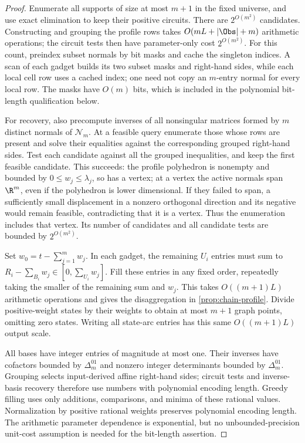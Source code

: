 \begin{proof}
Enumerate all supports of size at most $m+1$ in the fixed universe,
and use exact elimination to keep their positive circuits. There
are $2^{O(m^2)}$ candidates. Constructing and grouping the profile
rows takes $O(mL+|\Obs|+m)$ arithmetic operations; the circuit
tests then have parameter-only cost $2^{O(m^2)}$.
For this count, preindex subset normals by bit masks and cache the
singleton indices. A scan of each gadget builds its two subset masks
and right-hand sides, while each local cell row uses a cached index;
one need not copy an $m$-entry normal for every local row. The masks
have $O(m)$ bits, which is included in the polynomial bit-length
qualification below.

For recovery, also precompute inverses of all nonsingular matrices
formed by $m$ distinct normals of $\mathcal N_m$. At a feasible
query enumerate those whose rows are present and solve their
equalities against the corresponding grouped right-hand sides.
Test each candidate against all the grouped inequalities, and keep
the first feasible candidate. This succeeds: the profile polyhedron
is nonempty and bounded by $0\le w_j\le\lambda_j$, so has a
vertex; at a vertex the active normals span $\R^m$, even if the
polyhedron is lower dimensional. If they failed to span, a sufficiently
small displacement in a nonzero orthogonal direction and its negative
would remain feasible, contradicting that it is a vertex. Thus the
enumeration includes that vertex. Its number of candidates and all
candidate tests are bounded by $2^{O(m^2)}$.

Set $w_0=t-\sum_{j=1}^mw_j$. In each gadget, the remaining
$U_i$ entries must sum to
$R_i-\sum_{B_i}w_j\in[0,\sum_{U_i}w_j]$. Fill these entries
in any fixed order, repeatedly taking the smaller of the remaining
sum and $w_j$. This takes $O((m+1)L)$ arithmetic operations and
gives the disaggregation in \cref{prop:chain-profile}. Divide
positive-weight states by their weights to obtain at most $m+1$
graph points, omitting zero states. Writing all state-arc entries
has this same $O((m+1)L)$ output scale.

All bases have integer entries of magnitude at most one. Their
inverses have cofactors bounded by $\Delta^{01}_m$ and nonzero integer
determinants bounded by $\Delta^{01}_m$. Grouping selects input-derived
affine right-hand sides; circuit tests and inverse-basis recovery
therefore use numbers with polynomial encoding length. Greedy filling
uses only additions, comparisons, and minima of these rational values.
Normalization by positive rational weights preserves polynomial
encoding length. The arithmetic parameter dependence is exponential,
but no unbounded-precision unit-cost assumption is needed for the
bit-length assertion.
\end{proof}

